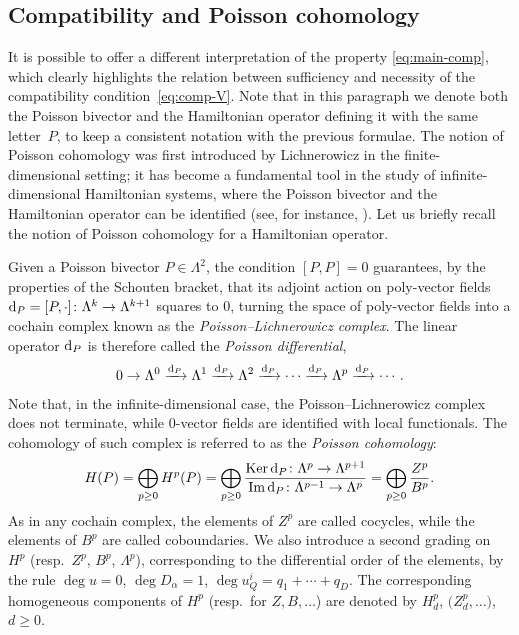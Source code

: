 \documentclass[pdftex]{sigma}
\numberwithin{equation}{section}
\begin{document}
\subsection{Compatibility and Poisson cohomology}\label{sec:Pois}
It is possible to offer a different interpretation of the property \eqref{eq:main-comp}, which clearly highlights the relation between sufficiency and necessity of the compatibility condition~\eqref{eq:comp-V}. Note that in this paragraph we denote both the Poisson bivector and the Hamiltonian operator defining it with the same letter~$P$, to keep a consistent notation with the previous formulae. The notion of Poisson cohomology was first introduced by Lichnerowicz \cite{lichnerowicz1977varietes} in the finite-dimensional setting; it has become a fundamental tool in the study of infinite-dimensional Hamiltonian systems, where the Poisson bivector and the Hamiltonian operator can be identified (see, for instance, \cite{dubrovin2001normal,getzler}). Let us briefly recall the notion of Poisson cohomology for a Hamiltonian operator.

Given a Poisson bivector $P\in\Lambda^2$, the condition $[P,P]=0$ guarantees, by the properties of the Schouten bracket, that its adjoint action on poly-vector fields ${\rm d}_P=[P,\cdot]\colon\Lambda^k\to\Lambda^{k+1}$ squares to 0, turning the space of poly-vector fields into a cochain complex known as the \emph{Poisson--Lichnerowicz complex}. The linear operator ${\rm d}_P$ is therefore called the \emph{Poisson differential},
\begin{gather*}
0\to\Lambda^0\xrightarrow{{\rm d}_P}\Lambda^1\xrightarrow{{\rm d}_P}\Lambda^2\xrightarrow{{\rm d}_P}\cdots\xrightarrow{{\rm d}_P}\Lambda^p\xrightarrow{{\rm d}_P}\cdots.
\end{gather*}
Note that, in the infinite-dimensional case, the Poisson--Lichnerowicz complex does not terminate, while $0$-vector fields are identified with local functionals. The cohomology of such complex is referred to as the \emph{Poisson cohomology}:
\begin{gather*}
H(P)=\bigoplus\limits_{p\geq 0}H^p(P)=\bigoplus\limits_{p\geq 0}\frac{\operatorname{Ker}{\rm d}_P\colon\Lambda^p\to\Lambda^{p+1}}{\operatorname{Im} {\rm d}_P\colon\Lambda^{p-1}\to\Lambda^p}=\bigoplus\limits_{p\geq 0}\frac{Z^p}{B^p}.
\end{gather*}
As in any cochain complex, the elements of $Z^p$ are called cocycles, while the elements of $B^p$ are called coboundaries. We also introduce a second grading on $H^p$ (resp.\ $Z^p$, $B^p$, $\Lambda^p$), corresponding to the differential order of the elements, by the rule $\deg u=0$, $\deg D_\alpha=1$, $\deg u^i_Q=q_1+\cdots+q_D$. The corresponding homogeneous components of $H^p$ (resp.\ for $Z,B,\ldots$) are denoted by $H^p_d$, $\big(Z^p_d,\ldots\big)$, $d\geq 0$.
\end{document}
